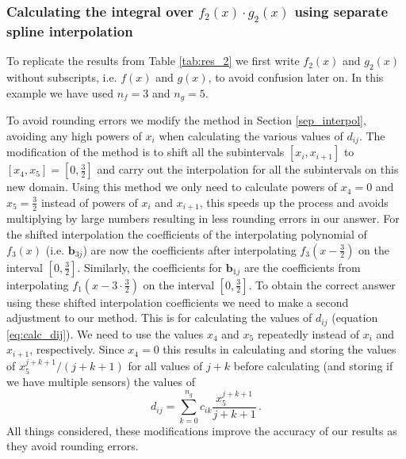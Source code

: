 \subsubsection{Calculating the integral over $f_2(x) \cdot g_2(x)$ using separate spline interpolation}
To replicate the results from Table \ref{tab:res_2} we first write $f_2(x)$ and $g_2(x)$ without subscripts, i.e. $f(x)$ and $g(x)$, to avoid confusion later on.
In this example we have used $n_f=3$ and $n_g = 5$.

To avoid rounding errors we modify the method in Section \ref{sep_interpol}, avoiding any high powers of $x_i$ when calculating the various values of $d_{ij}$.
The modification of the method is to shift all the subintervals $[x_i, x_{i+1}]$ to $[x_4, x_5] = [0, \frac{3}{2}]$ and carry out the interpolation for all the subintervals on this new domain.
Using this method we only need to calculate powers of $x_4=0$ and $x_5=\frac{3}{2}$ instead of powers of $x_i$ and $x_{i+1}$, this speeds up the process and avoids multiplying by large numbers resulting in less rounding errors in our answer.
For the shifted interpolation the coefficients of the interpolating polynomial of $f_3(x)$ (i.e. $\mathbf b_{3j}$) are now the coefficients after interpolating $f_3(x-\frac{3}{2})$ on the interval $[0, \frac{3}{2}]$.
Similarly, the coefficients for $\mathbf b_{1j}$ are the coefficients from interpolating $f_1(x-3\cdot \frac{3}{2})$ on the interval $[0, \frac{3}{2}]$.
To obtain the correct answer using these shifted interpolation coefficients we need to make a second adjustment to our method.
This is for calculating the values of $d_{ij}$ (equation \ref{eq:calc_dij}).
We need to use the values $x_4$ and $x_5$ repeatedly instead of $x_{i}$ and $x_{i+1}$, respectively.
Since $x_4=0$ this results in calculating and storing the values of $x_{5}^{j+k+1}/(j+k+1)$ for all values of $j+k$ before calculating (and storing if we have multiple sensors) the values of
\begin{equation}
    d_{ij} = \sum_{k=0}^{n_g} c_{ik} \frac{x_{5}^{j+k+1}}{j+k+1} \,. \nonumber
\end{equation}
All things considered, these modifications improve the accuracy of our results as they avoid rounding errors.

